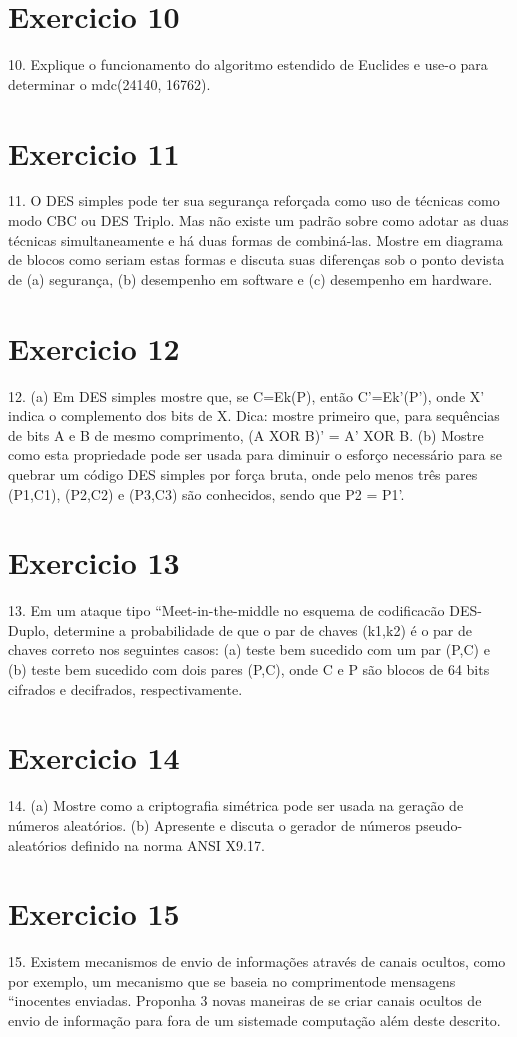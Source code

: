 \documentclass[10pt,a4paper]{article}
\begin{document}
\section*{Exercicio 10}
10. Explique o funcionamento do algoritmo estendido de Euclides e use-o para determinar o mdc(24140, 16762).
\section*{Exercicio 11}
11. O DES simples pode ter sua segurança reforçada como uso de técnicas como modo CBC ou DES Triplo. Mas não existe um padrão sobre como adotar as duas técnicas simultaneamente e há duas formas de combiná-las. Mostre em diagrama de blocos como seriam estas formas e discuta suas diferenças sob o ponto devista de (a) segurança, (b) desempenho em software e (c) desempenho em hardware.
\section*{Exercicio 12}
12. (a) Em DES simples mostre que, se C=Ek(P), então C'=Ek'(P'), onde X' indica o complemento dos bits de X. Dica: mostre primeiro que, para sequências de bits A e B de mesmo comprimento, (A XOR B)' = A' XOR B.
(b) Mostre como esta propriedade pode ser usada para diminuir o esforço necessário para se quebrar um código DES simples por força bruta, onde pelo menos três pares (P1,C1), (P2,C2) e (P3,C3) são conhecidos, sendo que P2 = P1'.
\section*{Exercicio 13}
13. Em um ataque tipo ``Meet-in-the-middle no esquema de codificacão DES-Duplo, determine a probabilidade de que o par de chaves (k1,k2) é o par de chaves correto nos seguintes casos: (a) teste bem sucedido com um par (P,C) e (b) teste bem sucedido com dois pares (P,C), onde C e P são blocos de 64 bits cifrados e decifrados, respectivamente.
\section*{Exercicio 14}
14. (a) Mostre como a criptografia simétrica pode ser usada na geração de números aleatórios.
(b) Apresente e discuta o gerador de números pseudo-aleatórios definido na norma ANSI X9.17.
\section*{Exercicio 15}
15. Existem mecanismos de envio de informações através de canais ocultos, como por exemplo, um mecanismo que se baseia no comprimentode mensagens ``inocentes enviadas. Proponha 3 novas maneiras de se criar canais ocultos de envio de informação para fora de um sistemade computação além deste descrito.
\end{document}
